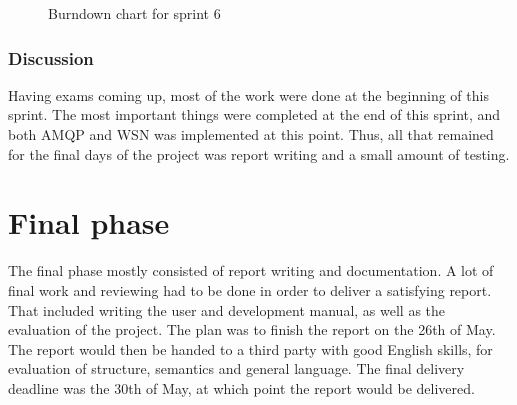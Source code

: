 \begin{center}
  \begin{figure}[ht!]
    \caption{Burndown chart for sprint 6}
    \label{fig:sprint 6, burndown}
  \end{figure}
\end{center}

\subsubsection{Discussion}
\label{subsec:project_lifecycle-development-sprint_6-discussion}

Having exams coming up, most of the work were done at the beginning of this sprint. The most important things were completed at the end of this sprint, and both AMQP and WSN was implemented at this point. Thus, all that remained for the final days of the project was report writing and a small amount of testing. 

\section{Final phase}

The final phase mostly consisted of report writing and documentation. A lot of final work and reviewing had to be done in order to deliver a satisfying report. That included writing the user and development manual, as well as the evaluation of the project. The plan was to finish the report on the 26th of May. The report would then be handed to a third party with good English skills, for evaluation of structure, semantics and general language. The final delivery deadline was the 30th of May, at which point the report would be delivered.


